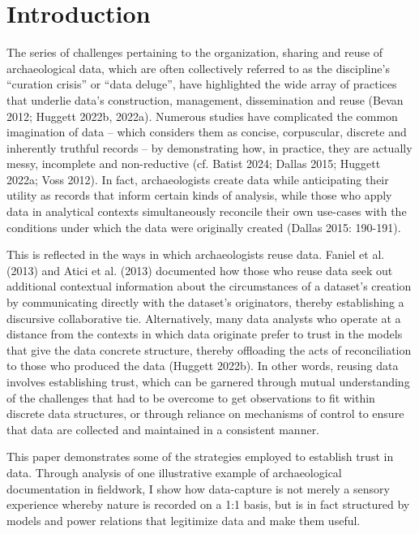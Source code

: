\documentclass[
]{article}
\begin{document}
\section{Introduction}\label{introduction}

The series of challenges pertaining to the organization, sharing and
reuse of archaeological data, which are often collectively referred to
as the discipline's ``curation crisis'' or ``data deluge'', have
highlighted the wide array of practices that underlie data's
construction, management, dissemination and reuse (Bevan 2012; Huggett
2022b, 2022a). Numerous studies have complicated the common imagination
of data -- which considers them as concise, corpuscular, discrete and
inherently truthful records -- by demonstrating how, in practice, they
are actually messy, incomplete and non-reductive (cf. Batist 2024;
Dallas 2015; Huggett 2022a; Voss 2012). In fact, archaeologists create
data while anticipating their utility as records that inform certain
kinds of analysis, while those who apply data in analytical contexts
simultaneously reconcile their own use-cases with the conditions under
which the data were originally created (Dallas 2015: 190-191).

This is reflected in the ways in which archaeologists reuse data. Faniel
et al. (2013) and Atici et al. (2013) documented how those who reuse
data seek out additional contextual information about the circumstances
of a dataset's creation by communicating directly with the dataset's
originators, thereby establishing a discursive collaborative tie.
Alternatively, many data analysts who operate at a distance from the
contexts in which data originate prefer to trust in the models that give
the data concrete structure, thereby offloading the acts of
reconciliation to those who produced the data (Huggett 2022b). In other
words, reusing data involves establishing trust, which can be garnered
through mutual understanding of the challenges that had to be overcome
to get observations to fit within discrete data structures, or through
reliance on mechanisms of control to ensure that data are collected and
maintained in a consistent manner.

This paper demonstrates some of the strategies employed to establish
trust in data. Through analysis of one illustrative example of
archaeological documentation in fieldwork, I show how data-capture is
not merely a sensory experience whereby nature is recorded on a 1:1
basis, but is in fact structured by models and power relations that
legitimize data and make them useful.
\end{document}
